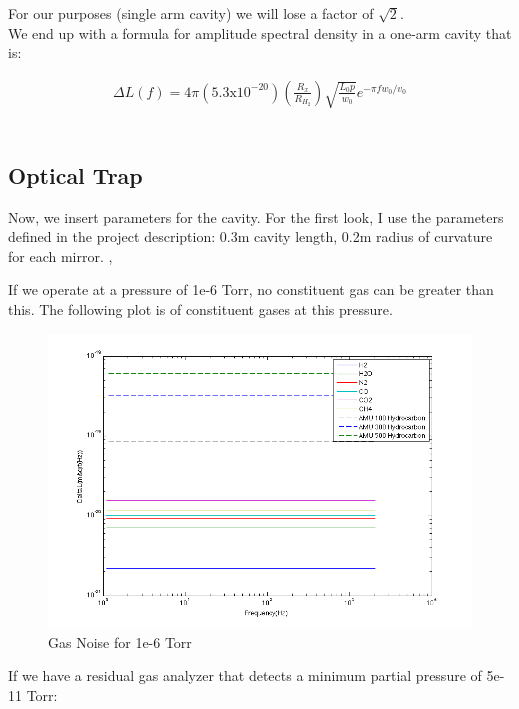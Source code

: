 For our purposes (single arm cavity) we will lose a factor of $ \sqrt{2} $. \\

We end up with a formula for amplitude spectral density in a one-arm cavity that is:

\begin{align*}
\Delta L ( f ) = 4 \pi \left( 5.3 \mathrm{x} 10^{-20} \right) \left(  \frac{R_x}{R_{H_2}} \right) \sqrt{\frac{ L_0 p}{ w_0 } } e^{- \pi f w_0 / v_0 }
\end{align*} \\

\subsection{Optical Trap}

Now, we insert parameters for the cavity. For the first look, I use the parameters defined in the project description: 0.3m cavity length, 0.2m radius of curvature for each mirror.
,

If we operate at a pressure of 1e-6 Torr, no constituent gas can be greater than this. The following plot is of constituent gases at this pressure.

\begin{figure}[htbp]
	\centering
		\includegraphics[width=15cm]{./figures/trapgasnoise_1.png}
	\caption[Gas Noise Comparison]{Gas Noise for 1e-6 Torr}
	\label{fig:gas_noise1}
\end{figure}

If we have a residual gas analyzer that detects a minimum partial pressure of 5e-11 Torr:

